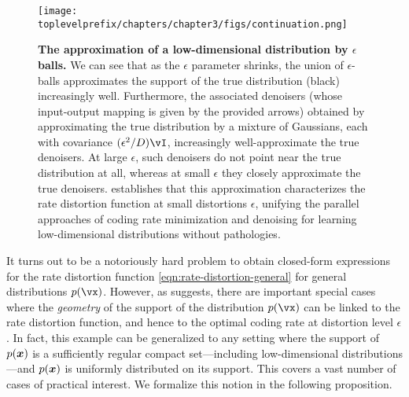 \documentclass[../../book-main.tex]{subfiles}
\begin{document}
\begin{figure}[t]
	\centering 
	\texttt{[image: \\toplevelprefix/chapters/chapter3/figs/continuation.png]}
	\caption{\small\textbf{The approximation of a low-dimensional distribution
	by \(\epsilon\) balls.} We can see that as the \(\epsilon\) parameter
	shrinks, the union of \(\epsilon\)-balls approximates the support of the
	true distribution (black) increasingly well. Furthermore, the associated
	denoisers (whose input-output mapping is given by the provided arrows)
	obtained by approximating the true distribution by a mixture of Gaussians,
	each with covariance \((\epsilon^{2}/D)\vI\), increasingly well-approximate
	the true denoisers. At large \(\epsilon\), such denoisers do not point near
	the true distribution at all, whereas at small \(\epsilon\) they closely
	approximate the true denoisers. 
	establishes that this approximation characterizes the rate distortion
	function at small distortions $\epsilon$, unifying the parallel approaches
	of coding rate minimization and denoising for learning low-dimensional
	distributions without pathologies.}
	\label{fig:continuation}
\end{figure}

It turns out to be a notoriously hard problem to obtain closed-form expressions
for the rate distortion function \eqref{eqn:rate-distortion-general} for general
distributions $p(\vx)$. However, as
 suggests, there are important
special cases where the \textit{geometry} of the support of the distribution
$p(\vx)$ can be linked to the rate distortion function, and hence to the optimal
coding rate at distortion level $\epsilon$.
In fact, this example can be generalized to any setting where the
support of $p(\bm{x})$ is a sufficiently regular compact set---including
low-dimensional distributions---and $p(\bm{x})$ is uniformly distributed on its
support.
This covers a vast number of cases of practical interest.
We formalize this notion in the following proposition.


%
\end{document}
